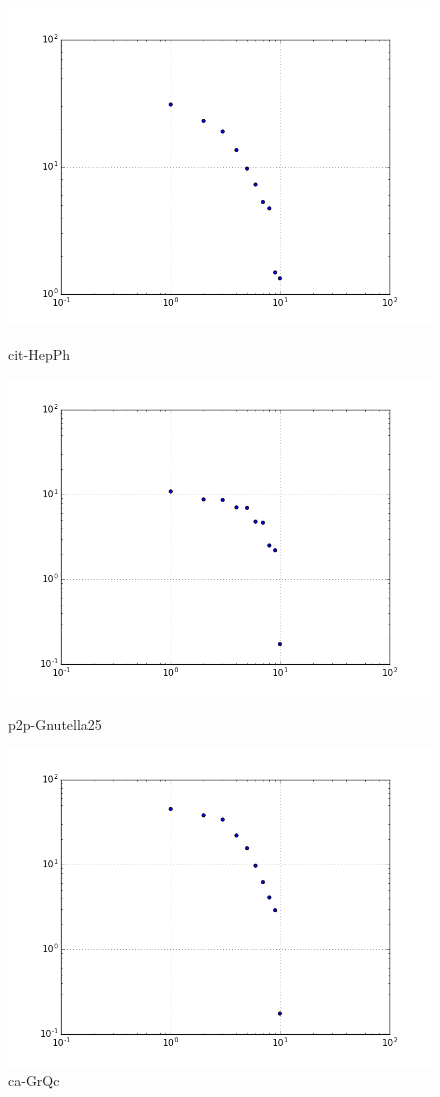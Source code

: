 \begin{figure}[H]
  \includegraphics[width=\linewidth]{img/cit-HepPh/eig.png}
  \caption*{cit-HepPh}
\endminipage\hfill
{}
  \includegraphics[width=\linewidth]{img/p2p-Gnutella25/eig.png}
  \caption*{p2p-Gnutella25}
\endminipage\hfill
{}
  \includegraphics[width=\linewidth]{img/ca-GrQc/eig.png}
  \caption*{ca-GrQc}
\endminipage
\end{figure}
